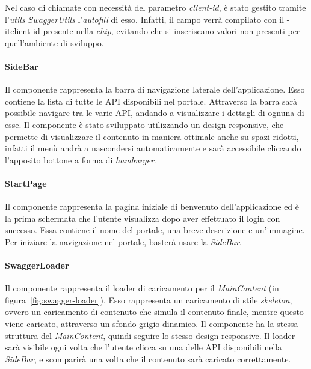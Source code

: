 \pagebreak

Nel caso di chiamate con necessità del parametro \textit{client-id}, è stato gestito tramite l'\textit{utils SwaggerUtils} l'\textit{autofill} di esso.
Infatti, il campo verrà compilato con il \text-it{client-id} presente nella \textit{chip}, evitando che si inseriscano valori non presenti per 
quell'ambiente di sviluppo.

\paragraph{SideBar}\label{par:side-bar}
Il componente rappresenta la barra di navigazione laterale dell'applicazione. Esso contiene la lista di tutte le API disponibili nel portale.
Attraverso la barra sarà possibile navigare tra le varie API, andando a visualizzare i dettagli di ognuna di esse. 
Il componente è stato sviluppato utilizzando un design responsive, che permette di visualizzare il contenuto in maniera ottimale anche su spazi ridotti, 
infatti il menù andrà a nascondersi automaticamente e sarà accessibile cliccando l'apposito bottone a forma di \textit{hamburger}.\\


\paragraph{StartPage}\label{par:start-page}
Il componente rappresenta la pagina iniziale di benvenuto dell'applicazione ed è la prima schermata che l'utente visualizza dopo aver effettuato il login con successo.
Essa contiene il nome del portale, una breve descrizione e un'immagine. Per iniziare la navigazione nel portale, basterà usare la \textit{SideBar}.

\paragraph{SwaggerLoader}\label{par:swagger-loader}
Il componente rappresenta il loader di caricamento per il \textit{MainContent} (in figura~\ref{fig:swagger-loader}). 
Esso rappresenta un caricamento di stile \textit{skeleton}, ovvero un caricamento di contenuto che simula il contenuto finale, mentre questo viene caricato, attraverso un sfondo grigio dinamico.
Il componente ha la stessa struttura del \textit{MainContent}, quindi seguire lo stesso design responsive.
Il loader sarà visibile ogni volta che l'utente clicca su una delle API disponibili nella \textit{SideBar}, e scomparirà una volta che il contenuto sarà caricato correttamente.


